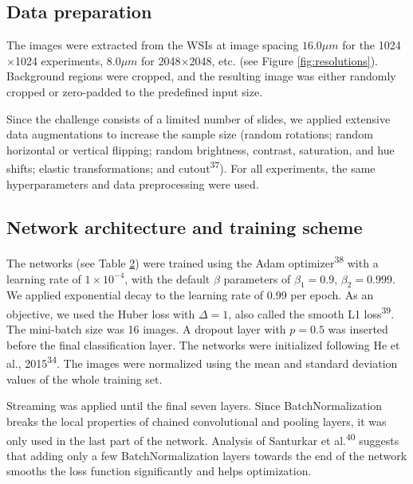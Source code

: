 \documentclass[
  12pt,
  a5,margin=2cmpaper,
]{article}
\begin{document}
\hypertarget{data-preparation-1}{%
\subsection{Data preparation}\label{data-preparation-1}}

The images were extracted from the WSIs at image spacing \(16.0\mu m\)
for the 1024\(\times\)1024 experiments, \(8.0\mu m\) for
2048\(\times\)2048, etc. (see Figure
\protect\hyperlink{fig:resolutions}{{[}fig:resolutions{]}}). Background
regions were cropped, and the resulting image was either randomly
cropped or zero-padded to the predefined input size.

Since the challenge consists of a limited number of slides, we applied
extensive data augmentations to increase the sample size (random
rotations; random horizontal or vertical flipping; random brightness,
contrast, saturation, and hue shifts; elastic transformations; and
cutout\textsuperscript{37}). For all experiments, the same
hyperparameters and data preprocessing were used.

\hypertarget{network-architecture-and-training-scheme-1}{%
\subsection{Network architecture and training
scheme}\label{network-architecture-and-training-scheme-1}}

The networks (see Table \protect\hyperlink{tab:extset}{2}) were trained
using the Adam optimizer\textsuperscript{38} with a learning rate of
\(1 \times 10^{-4}\), with the default \(\beta\) parameters of
\(\beta_1=0.9\), \(\beta_2=0.999\). We applied exponential decay to the
learning rate of 0.99 per epoch. As an objective, we used the Huber loss
with \(\Delta=1\), also called the smooth L1 loss\textsuperscript{39}.
The mini-batch size was 16 images. A dropout layer with \(p=0.5\) was
inserted before the final classification layer. The networks were
initialized following He et al., 2015\textsuperscript{34}. The images
were normalized using the mean and standard deviation values of the
whole training set.

Streaming was applied until the final seven layers. Since
BatchNormalization breaks the local properties of chained convolutional
and pooling layers, it was only used in the last part of the network.
Analysis of Santurkar et al.\textsuperscript{40} suggests that adding
only a few BatchNormalization layers towards the end of the network
smooths the loss function significantly and helps optimization.
\end{document}
